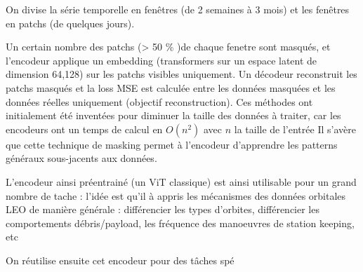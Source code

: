 \documentclass{article}
\begin{document}
    On divise la série temporelle en fenêtres (de 2 semaines à 3 mois) et les fenêtres en patchs (de quelques jours).
    

    Un certain nombre des patchs (> 50 \% )de chaque fenetre sont masqués, et l'encodeur applique un embedding (transformers sur un espace latent de dimension 64,128) sur les patchs visibles uniquement.
    Un décodeur reconstruit les patchs masqués et la loss MSE est calculée entre les données masquées et les données réelles uniquement (objectif reconstruction).
    Ces méthodes ont initialement été inventées pour diminuer la taille des données à traiter, car les encodeurs ont un temps de calcul en $O(n^ 2)$ avec $n$ la taille de l'entrée
    Il s'avère que cette technique de masking permet à l'encodeur d'apprendre les patterns généraux sous-jacents aux données.

    L'encodeur ainsi préentrainé (un ViT classique) est ainsi utilisable pour un grand nombre de tache : l'idée est qu'il à appris les mécanismes des données orbitales LEO de manière générale : différencier les types d'orbites, différencier les comportements débris/payload, les fréquence des manoeuvres de station keeping, etc

    On réutilise ensuite cet encodeur pour des tâches spé
\end{document}
